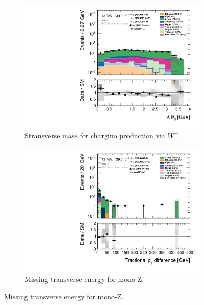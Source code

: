 \begin{figure}[H]
\begin{subfigure}[t!]{0.49\textwidth}
        \includegraphics[width=\textwidth]{Figures/MonoZcuts/hist1d_deltaRll_mono_Z.pdf}
    \caption{Stransverse mass for chargino production via $W^\pm$.}
    \label{fig:my_label}
    \end{subfigure}
    \begin{subfigure}[t!]{0.49\textwidth}
        \includegraphics[width=\textwidth]{Figures/MonoZcuts/hist1d_pTdiff_mono_Z.pdf}
    \caption{Missing transverse energy for mono-Z.}
    \label{fig:my_label}
    \end{subfigure}
\end{figure}
\restoregeometry


